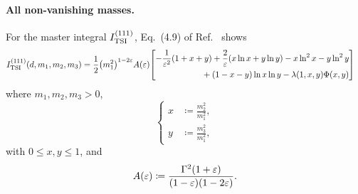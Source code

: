 \documentclass{article}
\begin{document}
            \paragraph{All non-vanishing masses.}
            For the master integral $\TSI{111}$, Eq.~(4.9) of Ref.~\cite{Davydychev:1992mt} shows
            \begin{equation}
                \begin{aligned}
                    \TSI{111}[d, m_1, m_2, m_3] & = \frac{1}{2} \qty(m_1^2)^{1 - 2 \varepsilon} A(\varepsilon) \qty[
                        \begin{aligned}
                            -\frac{1}{\varepsilon^2} \qty(1 + x + y) + \frac{2}{\varepsilon} \qty(x \ln x + y \ln y) - x \ln^2 x - y \ln^2 y \\
                            {} + (1 - x - y) \ln x \ln y - \lambdaFun{1, x, y} \Phi(x, y)
                        \end{aligned}
                    ]
                \end{aligned}
                \label{eq:TSI-111}
            \end{equation}
            where $m_1, m_2, m_3 > 0$,
            \begin{equation}
                \left\{
                    \begin{aligned}
                        x & \coloneq \frac{m_2^2}{m_1^2}, \\
                        y & \coloneq \frac{m_3^2}{m_1^2},
                    \end{aligned}
                \right.
            \end{equation}
            with $0 \le x, y \le 1$, and
            \begin{equation}
                A(\varepsilon) \coloneq \frac{\Gamma^2\qty(1 + \varepsilon)}{(1 - \varepsilon) (1 - 2 \varepsilon)}.
            \end{equation}
            
\end{document}
